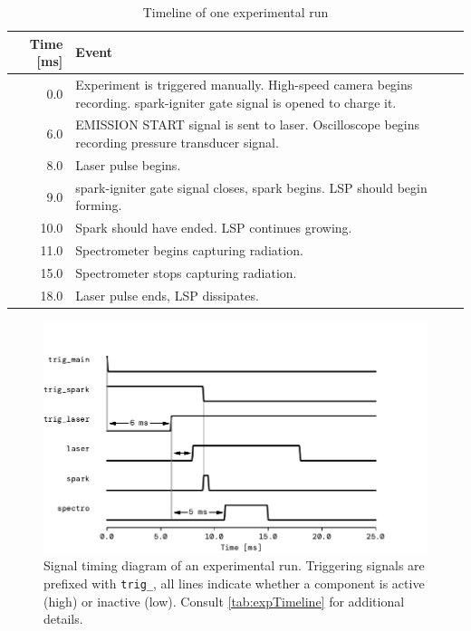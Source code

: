                 \begin{table}[h]
                    \centering
                    \caption{Timeline of one experimental run}
                    \label{tab:expTimeline}
                    \begin{tabularx}{\textwidth}{rX}
                        \toprule
                        Time [ms]   & Event \\
                        \midrule
                        0.0         & Experiment is triggered manually. High-speed camera begins recording. spark-igniter gate signal is opened to charge it. \\
                        6.0         & EMISSION START signal is sent to laser. Oscilloscope begins recording pressure transducer signal. \\
                        8.0         & Laser pulse begins.    \\
                        9.0         & spark-igniter gate signal closes, spark begins. LSP should begin forming. \\
                        10.0        & Spark should have ended. LSP continues growing.   \\
                        11.0        & Spectrometer begins capturing radiation.  \\
                        15.0        & Spectrometer stops capturing radiation.   \\
                        18.0        & Laser pulse ends, LSP dissipates. \\
                        \bottomrule
                    \end{tabularx}
                \end{table}
                
                \begin{figure}[h]
                    \centering
                    \includegraphics[]{assets/3 design/timings}
                    \caption[Signal timing diagram of an experimental run]{Signal timing diagram of an experimental run. Triggering signals are prefixed with \texttt{trig\_}, all lines indicate whether a component is active (high) or inactive (low). Consult \autoref{tab:expTimeline} for additional details.}
                    \label{fig:timings}
                \end{figure}
                
